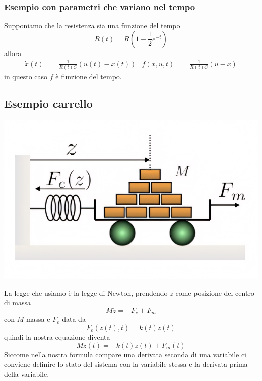 \documentclass{article}
\numberwithin{equation}{subsection}
\let\oldsubsection\subsection%
\renewcommand{\subsection}{%
  \renewcommand{\theequation}{\thesubsection.\arabic{equation}}%
  \oldsubsection}%
\begin{document}
\subsubsection{Esempio con parametri che variano nel tempo}
Supponiamo che la resistenza sia una funzione del tempo
\begin{equation}
    R(t) = \overline{R} \left(1- \frac{1}{2} e^{-t} \right)
\end{equation}
allora 
\begin{align*}
    \dot x(t) &= \frac{1}{R(t)C} \left(u(t)-x(t)\right) &
    f(x,u,t) &= \frac{1}{R(t)C}(u-x)
\end{align*}
in questo caso $f$ è funzione del tempo.



\subsection{Esempio carrello}
\begin{center}
    \includegraphics[scale=0.2]{Images/Es_carrello.png}
\end{center}
La legge che usiamo è la legge di Newton, prendendo $z$ come posizione del centro di massa
\begin{equation}
    M \ddot  z = -F_e + F_m
\end{equation}
con $M$ massa e $F_e$ data da
\begin{equation}
    F_e (z(t), t) = k(t)z(t)
\end{equation}
quindi la nostra equazione diventa
\begin{equation}
    M \ddot  z(t) = -k(t)z(t) + F_m(t)
\end{equation}
Siccome nella nostra formula compare una derivata seconda di una variabile ci conviene definire lo stato del sistema con la variabile stessa e la derivata prima della variabile.\\
\end{document}
